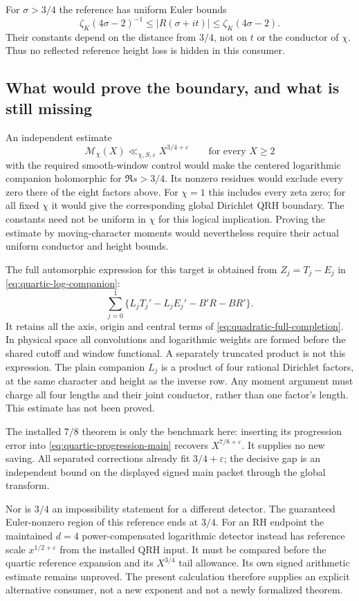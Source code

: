 \documentclass[11pt]{article}
\newcommand{\eps}{\varepsilon}
\begin{document}
For $\sigma>3/4$ the reference has uniform Euler bounds
\[
 \zeta_K(4\sigma-2)^{-1}\le |R(\sigma+it)|
                         \le\zeta_K(4\sigma-2).
\]
Their constants depend on the distance from $3/4$, not on $t$ or
the conductor of $\chi$. Thus no reflected reference height loss
is hidden in this consumer.

\subsection{What would prove the boundary, and what is still missing}
An independent estimate
\[
 \mathcal M_\chi(X)\ll_{\chi,S,\eps}X^{3/4+\eps}
       \qquad\text{for every }X\ge2
\]
with the required smooth-window control would make the centered
logarithmic companion holomorphic for $\Re s>3/4$.
Its nonzero residues would exclude every zero there of the eight
factors above. For $\chi=1$ this includes every zeta zero;
for all fixed $\chi$ it would give the corresponding global
Dirichlet QRH boundary. The constants need not be uniform in
$\chi$ for this logical implication. Proving the estimate by
moving-character moments would nevertheless require their actual
uniform conductor and height bounds.

The full automorphic expression for this target is obtained from
$Z_j=T_j-E_j$ in \eqref{eq:quartic-log-companion}:
\[
 \sum_{j=0}^1
       \{L_jT_j'-L_jE_j'-B'R-BR'\}.
\]
It retains all the axis, origin and central terms of
\eqref{eq:quadratic-full-completion}. In physical space all
convolutions and logarithmic weights are formed before the
shared cutoff and window functional. A separately truncated
product is not this expression. The plain companion $L_j$ is
a product of four rational Dirichlet factors, at the same
character and height as the inverse row. Any moment argument
must charge all four lengths and their joint conductor, rather
than one factor's length. This estimate has not been proved.

The installed $7/8$ theorem is only the benchmark here:
inserting its progression error into
\eqref{eq:quartic-progression-main} recovers $X^{7/8+\eps}$.
It supplies no new saving. All separated corrections already
fit $3/4+\eps$; the decisive gap is an independent bound on the
displayed signed main packet through the global transform.

Nor is $3/4$ an impossibility statement for a different detector.
The guaranteed Euler-nonzero region of this reference ends at
$3/4$. For an RH endpoint the maintained $d=4$ power-compensated
logarithmic detector instead has reference scale $x^{1/2+\eps}$
from the installed QRH input. It must be compared before the
quartic reference expansion and its $X^{3/4}$ tail allowance.
Its own signed arithmetic estimate remains unproved.
The present calculation therefore supplies an explicit alternative
consumer, not a new exponent and not a newly formalized theorem.
\end{document}
